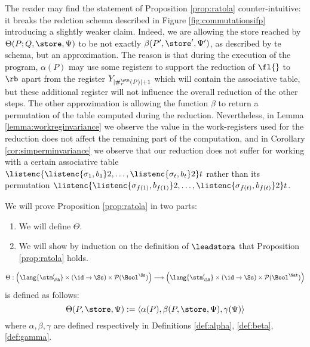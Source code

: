 The reader may find the statement of Proposition \ref{prop:ratola}
counter-intuitive: it breaks the redction schema described in
Figure \ref{fig:commutationsifp} introducing a slightly weaker claim.
Indeed, we are allowing the store reached by $\Theta(P;Q, \store, \Psi)$
to be not exactly $\beta(P',\store', \Psi')$, as described by te schema, but an
approximation. The reason is that during
the execution of the program, $\alpha(P)$ may use some registers
to support the reduction of $\fl{}$ to $\rb$ apart from the register
$Y_{{|\#_r^\stm(P)|+1}}$ which will contain the associative table, but these
additional register will not influence the overall reduction of the other steps.
The other approzimation is allowing the function $\beta$ to return a
permutation of the table computed during the reduction.
%
Nevertheless, in Lemma \ref{lemma:workreginvariance} we observe the value
in the work-registers used for the reduction does not affect the remaining part of
the computation, and in Corollary \ref{cor:simperminvariance} we observe that
our reduction does not suffer for working with a certain associative table
$\listenc{\listenc {\sigma_1, b_1} 2, \ldots, \listenc {\sigma_t, b_t} 2}t$
rather than its permutation
$\listenc{\listenc {\sigma_{f(1)}, b_{f(1)}} 2, \ldots, \listenc {\sigma_{f(t)}, b_{f(t)}} 2}t$.

We will prove Proposition \ref{prop:ratola} in two parts:

\begin{enumerate}
\item We will define $\Theta$.
\item We will show by induction on the definition of $\leadstora$ that
 Proposition \ref{prop:ratola} holds.
\end{enumerate}

\begin{defn}
  \label{def:Theta}
  $$
  \Theta: \left(\lang{\stm_\RA'}\times \left(\id\to{\Ss}\right)\times \mathcal P (\Bool^\Ss) \right)
  \longrightarrow
  \left(\lang{\stm_\LA'}\times \left(\id\to{\Ss}\right)\times \mathcal P (\Bool^\Nat) \right)
  $$
  is defined as follows:
  $$
  \Theta(P, \store, \Psi):= \langle \alpha(P), \beta(P, \store, \Psi), \gamma(\Psi)\rangle
  $$
  where $\alpha, \beta, \gamma$ are defined respectively in Definitions \ref{def:alpha}, \ref{def:beta}, \ref{def:gamma}.
\end{defn}

